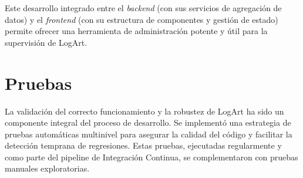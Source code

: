 Este desarrollo integrado entre el \textit{backend} (con sus servicios de agregación de datos) y el \textit{frontend} (con su estructura de componentes y gestión de estado) permite ofrecer una herramienta de administración potente y útil para la supervisión de LogArt.

\section{Pruebas}
\label{sec:pruebasCap4}

La validación del correcto funcionamiento y la robustez de LogArt ha sido un componente integral del proceso de desarrollo. Se implementó una estrategia de pruebas automáticas multinivel para asegurar la calidad del código y facilitar la detección temprana de regresiones. Estas pruebas, ejecutadas regularmente y como parte del pipeline de Integración Continua, se complementaron con pruebas manuales exploratorias.


